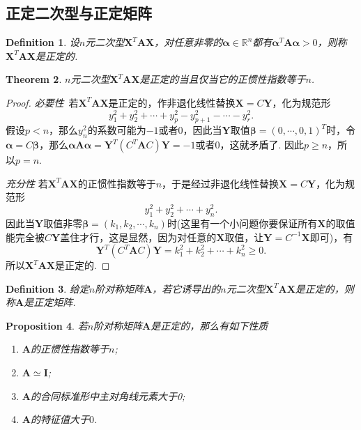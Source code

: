 \documentclass{article}
\newtheorem{theorem}{Theorem}[section]
\newtheorem{proposition}[theorem]{Proposition}
\newtheorem{definition}[theorem]{Definition}
\newcommand{\mbf}[1]{\bm{#1}}
\begin{document}
\subsection{正定二次型与正定矩阵}

\begin{definition}
\rm 设$n$元二次型$\mbf{X}^T\mbf{A}\mbf{X}$，对任意非零的$\mbf{\alpha} \in \mathbb{R}^n$都有$\mbf{\alpha}^T \mbf{A} \mbf{\alpha} > 0$，则称$\mbf{X}^T\mbf{A}\mbf{X}$是{\color{red}正定}的.
\end{definition}

\begin{theorem}
\rm $n$元二次型$\mbf{X}^T\mbf{A}\mbf{X}$是正定的当且仅当它的正惯性指数等于$n$.  
\end{theorem}

\begin{proof}
\rm \emph{必要性}\ 若$\mbf{X}^T\mbf{A}\mbf{X}$是正定的，作非退化线性替换$\mbf{X}=C\mbf{Y}$，化为规范形
$$
y_1 ^2 + y_2^2 + \cdots + y_p^2 - y_{p+1}^2 -\cdots -y_r^2.
$$
假设$p < n$，那么$y_n^2$的系数可能为$-1$或者$0$，因此当$\mbf{Y}$取值$\mbf{\beta} = (0,\cdots,0,1)^T$时，令$\mbf{\alpha} = C\mbf{\beta}$，那么$\mbf{\alpha}\mbf{A}\mbf{\alpha} = \mbf{Y}^T(C^T\mbf{A}C)\mbf{Y}=-1$或者$0$，这就矛盾了. 因此$p \geq  n$，所以$p = n$.

\emph{充分性} 若$\mbf{X}^T\mbf{A}\mbf{X}$的正惯性指数等于$n$，于是经过非退化线性替换$\mbf{X} = C\mbf{Y}$，化为规范形
$$
y_1^2 + y_2^2 + \cdots + y_n^2.
$$
因此当$\mbf{Y}$取值非零$\mbf{\beta}=(k_1,k_2,\cdots,k_n)$时(这里有一个小问题你要保证所有$\mbf{X}$的取值能完全被$C\mbf{Y}$盖住才行，这是显然，因为对任意的$\mbf{X}$取值，让$\mbf{Y}=C^{-1}\mbf{X} $即可)，有
$$
\mbf{Y}^T(C^T\mbf{A}C)\mbf{Y} = k_1^2 + k_2^2 + \cdots + k_n^2 \geq 0.
$$
所以$\mbf{X}^T\mbf{A}\mbf{X}$是正定的. 
\end{proof}

\begin{definition}
\rm 给定$n$阶对称矩阵$\mbf{A}$，若它诱导出的$n$元二次型$\mbf{X}^T\mbf{A}\mbf{X}$是正定的，则称$\mbf{A}$是{\color{red}正定矩阵}.
\end{definition}


\begin{proposition}
\rm 若$n$阶对称矩阵$\mbf{A}$是正定的，那么有如下性质
\begin{enumerate}
	\item $\mbf{A}$的正惯性指数等于$n$;
	\item $\mbf{A} \simeq \mbf{I}$;
	\item $\mbf{A}$的合同标准形中主对角线元素大于0;
	\item $\mbf{A}$的特征值大于$0$.
\end{enumerate}
\end{proposition}
\end{document}
